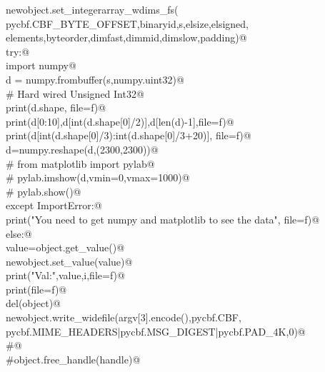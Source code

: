 \documentclass[10pt,a4paper,twoside,notitlepage]{article}
\begin{document}
\begin{flushleft}
\begin{minipage}{\linewidth}
\begin{list}{}{}
\mbox{}\verb@                    newobject.set_integerarray_wdims_fs(\@\\
\mbox{}\verb@                      pycbf.CBF_BYTE_OFFSET,binaryid,s,elsize,elsigned,\@\\
\mbox{}\verb@                      elements,byteorder,dimfast,dimmid,dimslow,padding)@\\
\mbox{}\verb@                    try:@\\
\mbox{}\verb@                       import numpy@\\
\mbox{}\verb@                       d = numpy.frombuffer(s,numpy.uint32)@\\
\mbox{}\verb@                       # Hard wired Unsigned Int32@\\
\mbox{}\verb@                       print(d.shape, file=f)@\\
\mbox{}\verb@                       print(d[0:10],d[int(d.shape[0]/2)],d[len(d)-1],file=f)@\\
\mbox{}\verb@                       print(d[int(d.shape[0]/3):int(d.shape[0]/3+20)], file=f)@\\
\mbox{}\verb@                       d=numpy.reshape(d,(2300,2300))@\\
\mbox{}\verb@    #                   from matplotlib import pylab@\\
\mbox{}\verb@    #                   pylab.imshow(d,vmin=0,vmax=1000)@\\
\mbox{}\verb@    #                   pylab.show()@\\
\mbox{}\verb@                    except ImportError:@\\
\mbox{}\verb@                       print("You need to get numpy and matplotlib to see the data", file=f)@\\
\mbox{}\verb@                else:@\\
\mbox{}\verb@                    value=object.get_value()@\\
\mbox{}\verb@                    newobject.set_value(value)@\\
\mbox{}\verb@                    print("Val:",value,i,file=f)@\\
\mbox{}\verb@        print(file=f)@\\
\mbox{}\verb@    del(object)@\\
\mbox{}\verb@    newobject.write_widefile(argv[3].encode(),pycbf.CBF,\@\\
\mbox{}\verb@        pycbf.MIME_HEADERS|pycbf.MSG_DIGEST|pycbf.PAD_4K,0)@\\
\mbox{}\verb@    #@\\
\mbox{}\verb@    #object.free_handle(handle)@\\
\mbox{}\verb@@{\NWsep}
\end{list}
\vspace{-1.5ex}
\footnotesize
\begin{list}{}{\setlength{\itemsep}{-\parsep}\setlength{\itemindent}{-\leftmargin}}

\item{}
\end{list}
\end{minipage}\vspace{4ex}
\end{flushleft}
\end{document}
